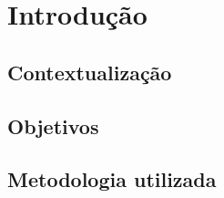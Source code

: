 \section{Introdução}

\subsection{Contextualização}

\subsection{Objetivos}

\subsection{Metodologia utilizada}
